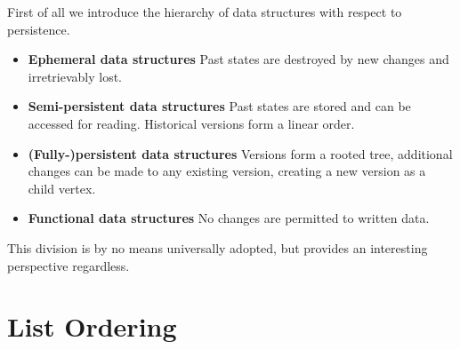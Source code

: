 First of all we introduce the hierarchy of data structures with respect to persistence.

\begin{itemize}
\item {\bfseries Ephemeral data structures} Past states are destroyed by new changes and irretrievably lost.
\item {\bfseries Semi-persistent data structures} Past states are stored and can be accessed for reading. Historical versions form a linear order.
\item {\bfseries (Fully-)persistent data structures} Versions form a rooted tree, additional changes can be made to any existing version, creating a new version as a child vertex.
\item {\bfseries Functional data structures} No changes are permitted to written data.
\end{itemize}

This division is by no means universally adopted, but provides an interesting perspective regardless.

\section{List Ordering}